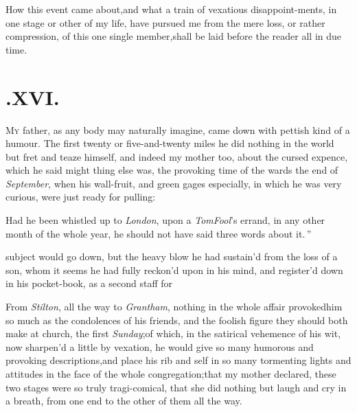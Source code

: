 \documentclass{article}
\begin{document}
How this event came about,\tsk  and what a train of vexatious
disappoint-\break ments, in one stage or other of my life, have pursued me
from the mere loss, or rather compression, of this one single
member,\tsk  shall be laid before the reader all in due time.

\section{.\enspace XVI.}

\lettrine{M}{y} father, as any body may naturally imagine, came down with\break
{} pettish kind of a humour. The
first\break
twenty or five-and-twenty miles he did nothing in the world but fret and teaze
himself, and indeed my mother too, about the cursed expence, which he said
might\break {}\break {} thing else was, the provoking time of the
 wards the end of
\textit{September}, when his wall-fruit, and green gages especially, in which he was
very curious, were just ready for pulling:\tsh  \begin{story}{Had he been} whistled
    up to \textit{London}, upon a \textit{Tom}\break\textit{Fool}’s errand, in any
    other month of the whole year, he should not have said three words about it.\,”
\end{story}

\vspace\parskip
\noindent
{}
subject would go down, but the heavy blow he
had sustain’d from the loss of a son, whom it seems he had fully
reckon’d upon in his mind, and register’d down in his pocket-book,
as a second staff for 

From \textit{Stilton}, all the way to \textit{Grantham}, nothing in
the whole affair provoked\break him so much as the condolences of his
friends, and the foolish figure they should both make at church,
the first \textit{Sunday};\break\tsk of which, in the satirical
vehemence of his wit, now sharpen’d a little by vexation, he
would give so many humorous and provoking descriptions,\tsk  and
place his rib and self in so many tormenting lights and attitudes
in the face of the whole congregation;\tsk  that my mother
declared, these two stages were so truly tragi-comical, that she
did nothing but laugh and cry in a breath, from one end to the
other of them all the way.\\
\end{document}
